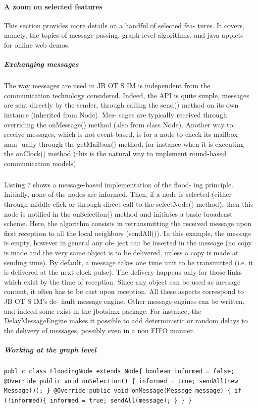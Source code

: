 \paragraph{A zoom on selected features}This section provides more details on a handful of selected fea- tures. It covers, namely, the topics of message passing, graph-level algorithms, and java applets for online web demos.
\subparagraph{Exchanging messages}The way messages are used in JB OT S IM is independent from the communication technology considered. Indeed, the API is quite simple, messages are sent directly by the sender, through calling the send() method on its own instance (inherited from Node). Mes- sages are typically received through overriding the onMessage() method (also from class Node). Another way to receive messages, which is not event-based, is for a node to check its mailbox man- ually through the getMailbox() method, for instance when it is executing the onClock() method (this is the natural way to implement round-based communication models). \subparagraph{}Listing 7 shows a message-based implementation of the flood- ing principle. Initially, none of the nodes are informed. Then, if a node is selected (either through middle-click or through direct call to the selectNode() method), then this node is notified in the onSelection() method and initiates a basic broadcast scheme. Here, the algorithm consists in retransmitting the received message upon first reception to all the local neighbors (sendAll()). In this example, the message is empty, however in general any ob- ject can be inserted in the message (no copy is made and the very same object is to be delivered, unless a copy is made at sending time). By default, a message takes one time unit to be transmitted (i.e. it is delivered at the next clock pulse). The delivery happens only for those links which exist by the time of reception. Since any object can be used as message content, it often has to be cast upon reception. All these aspects correspond to JB OT S IM’s de- fault message engine. Other message engines can be written, and indeed some exist in the jbotsimx package. For instance, the DelayMessageEngine makes it possible to add deterministic or random delays to the delivery of messages, possibly even in a non FIFO manner.
\subparagraph{Working at the graph level}
\begin{lstlisting}
public class FloodingNode extends Node{ boolean informed = false; @Override public void onSelection() { informed = true; sendAll(new Message()); } @Override public void onMessage(Message message) { if (!informed){ informed = true; sendAll(message); } } }
\end{lstlisting}
